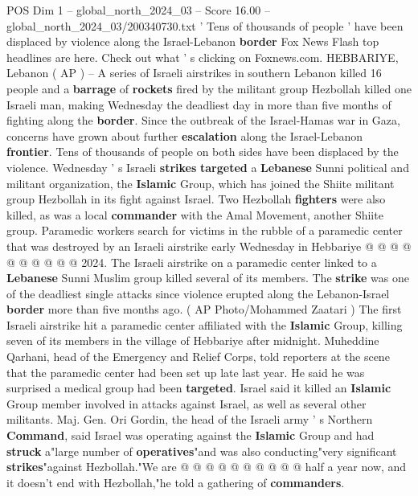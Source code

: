 \begin{textsample}{POS Dim 1 – global\_north\_2024\_03 – Score 16.00 – global\_north\_2024\_03/200340730.txt}  \label{ex:f1_pos_387}
' Tens of thousands of people ' have been displaced by violence along the Israel-Lebanon \textbf{border} Fox News Flash top headlines are here.
Check out what ' s clicking on Foxnews.com.
HEBBARIYE, Lebanon ( AP ) -- A series of Israeli airstrikes in southern Lebanon killed 16 people and a \textbf{barrage} of \textbf{rockets} fired by the militant group Hezbollah killed one Israeli man, making Wednesday the deadliest day in more than five months of fighting along the \textbf{border}.
Since the outbreak of the Israel-Hamas war in Gaza, concerns have grown about further \textbf{escalation} along the Israel-Lebanon \textbf{frontier}.
Tens of thousands of people on both sides have been displaced by the violence.
Wednesday ' s Israeli \textbf{strikes} \textbf{targeted} a \textbf{Lebanese} Sunni political and militant organization, the \textbf{Islamic} Group, which has joined the Shiite militant group Hezbollah in its fight against Israel.
Two Hezbollah \textbf{fighters} were also killed, as was a local \textbf{commander} with the Amal Movement, another Shiite group.
Paramedic workers search for victims in the rubble of a paramedic center that was destroyed by an Israeli airstrike early Wednesday in Hebbariye @ @ @ @ @ @ @ @ @ @ 2024.
The Israeli airstrike on a paramedic center linked to a \textbf{Lebanese} Sunni Muslim group killed several of its members.
The \textbf{strike} was one of the deadliest single attacks since violence erupted along the Lebanon-Israel \textbf{border} more than five months ago. ( AP Photo/Mohammed Zaatari ) The first Israeli airstrike hit a paramedic center affiliated with the \textbf{Islamic} Group, killing seven of its members in the village of Hebbariye after midnight.
Muheddine Qarhani, head of the Emergency and Relief Corps, told reporters at the scene that the paramedic center had been set up late last year.
He said he was surprised a medical group had been \textbf{targeted}.
Israel said it killed an \textbf{Islamic} Group member involved in attacks against Israel, as well as several other militants.
Maj.
Gen.
Ori Gordin, the head of the Israeli army ' s Northern \textbf{Command}, said Israel was operating against the \textbf{Islamic} Group and had \textbf{struck} a"large number of \textbf{operatives}"and was also conducting"very significant \textbf{strikes}"against Hezbollah."We are @ @ @ @ @ @ @ @ @ @ half a year now, and it doesn't end with Hezbollah,"he told a gathering of \textbf{commanders}.

\end{textsample}
